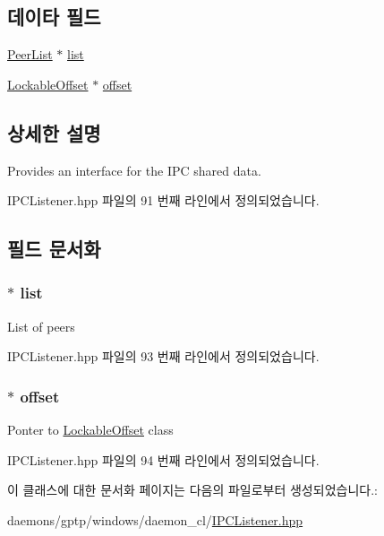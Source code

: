\subsection*{데이타 필드}
\begin{DoxyCompactItemize}
\item 
\hyperlink{class_peer_list}{Peer\+List} $\ast$ \hyperlink{class_i_p_c_shared_data_a0db886605e19248f347d4200c0152391}{list}
\item 
\hyperlink{class_lockable_offset}{Lockable\+Offset} $\ast$ \hyperlink{class_i_p_c_shared_data_a8e8c05aa69387039d0ea0ecffcae87ce}{offset}
\end{DoxyCompactItemize}


\subsection{상세한 설명}
Provides an interface for the I\+PC shared data. 

I\+P\+C\+Listener.\+hpp 파일의 91 번째 라인에서 정의되었습니다.



\subsection{필드 문서화}
\subsubsection[{\texorpdfstring{list}{list}}]{$\ast$ list}\hypertarget{class_i_p_c_shared_data_a0db886605e19248f347d4200c0152391}{}\label{class_i_p_c_shared_data_a0db886605e19248f347d4200c0152391}
List of peers 

I\+P\+C\+Listener.\+hpp 파일의 93 번째 라인에서 정의되었습니다.

\subsubsection[{\texorpdfstring{offset}{offset}}]{$\ast$ offset}\hypertarget{class_i_p_c_shared_data_a8e8c05aa69387039d0ea0ecffcae87ce}{}\label{class_i_p_c_shared_data_a8e8c05aa69387039d0ea0ecffcae87ce}
Ponter to \hyperlink{class_lockable_offset}{Lockable\+Offset} class 

I\+P\+C\+Listener.\+hpp 파일의 94 번째 라인에서 정의되었습니다.



이 클래스에 대한 문서화 페이지는 다음의 파일로부터 생성되었습니다.\+:\begin{DoxyCompactItemize}
\item 
daemons/gptp/windows/daemon\+\_\+cl/\hyperlink{_i_p_c_listener_8hpp}{I\+P\+C\+Listener.\+hpp}\end{DoxyCompactItemize}
